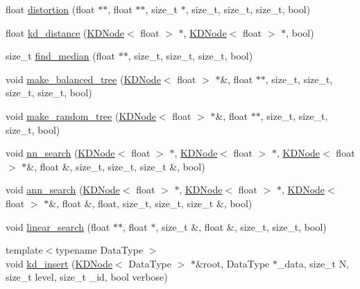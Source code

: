 \begin{DoxyCompactItemize}
\item 
float \hyperlink{namespaceSimpleCluster_accc735e7818254b8c8ee8a31a080bc29}{distortion} (float $\ast$$\ast$, float $\ast$$\ast$, size\-\_\-t $\ast$, size\-\_\-t, size\-\_\-t, size\-\_\-t, bool)
\item 
float \hyperlink{namespaceSimpleCluster_a2765eb2fabd01d585fcfa8f623626fcd}{kd\-\_\-distance} (\hyperlink{classSimpleCluster_1_1KDNode}{K\-D\-Node}$<$ float $>$ $\ast$, \hyperlink{classSimpleCluster_1_1KDNode}{K\-D\-Node}$<$ float $>$ $\ast$, bool)
\item 
size\-\_\-t \hyperlink{namespaceSimpleCluster_ac903f0c723c3c90bad0e83325b911b8c}{find\-\_\-median} (float $\ast$$\ast$, size\-\_\-t, size\-\_\-t, size\-\_\-t, bool)
\item 
void \hyperlink{namespaceSimpleCluster_a7708d4292cee2e693875643b5ed13722}{make\-\_\-balanced\-\_\-tree} (\hyperlink{classSimpleCluster_1_1KDNode}{K\-D\-Node}$<$ float $>$ $\ast$\&, float $\ast$$\ast$, size\-\_\-t, size\-\_\-t, size\-\_\-t, size\-\_\-t, bool)
\item 
void \hyperlink{namespaceSimpleCluster_a494b6c1b3a4a5e443b91ea43bf759270}{make\-\_\-random\-\_\-tree} (\hyperlink{classSimpleCluster_1_1KDNode}{K\-D\-Node}$<$ float $>$ $\ast$\&, float $\ast$$\ast$, size\-\_\-t, size\-\_\-t, size\-\_\-t, bool)
\item 
void \hyperlink{namespaceSimpleCluster_a5e5dd09f9f704510657bea12bbec67a0}{nn\-\_\-search} (\hyperlink{classSimpleCluster_1_1KDNode}{K\-D\-Node}$<$ float $>$ $\ast$, \hyperlink{classSimpleCluster_1_1KDNode}{K\-D\-Node}$<$ float $>$ $\ast$, \hyperlink{classSimpleCluster_1_1KDNode}{K\-D\-Node}$<$ float $>$ $\ast$\&, float \&, size\-\_\-t, size\-\_\-t, size\-\_\-t \&, bool)
\item 
void \hyperlink{namespaceSimpleCluster_a0b2e5916300b13d882b6c25f7e388cc2}{ann\-\_\-search} (\hyperlink{classSimpleCluster_1_1KDNode}{K\-D\-Node}$<$ float $>$ $\ast$, \hyperlink{classSimpleCluster_1_1KDNode}{K\-D\-Node}$<$ float $>$ $\ast$, \hyperlink{classSimpleCluster_1_1KDNode}{K\-D\-Node}$<$ float $>$ $\ast$\&, float \&, float, size\-\_\-t, size\-\_\-t, size\-\_\-t \&, bool)
\item 
void \hyperlink{namespaceSimpleCluster_acc2109ab0e58fa8b9827ec13f1e45038}{linear\-\_\-search} (float $\ast$$\ast$, float $\ast$, size\-\_\-t \&, float \&, size\-\_\-t, size\-\_\-t, bool)
\item 
{\footnotesize template$<$typename Data\-Type $>$ }\\void \hyperlink{namespaceSimpleCluster_af123d4d34a2721969c8e206492ec576a}{kd\-\_\-insert} (\hyperlink{classSimpleCluster_1_1KDNode}{K\-D\-Node}$<$ Data\-Type $>$ $\ast$\&root, Data\-Type $\ast$\-\_\-data, size\-\_\-t N, size\-\_\-t level, size\-\_\-t \-\_\-id, bool verbose)

\end{DoxyCompactItemize}
